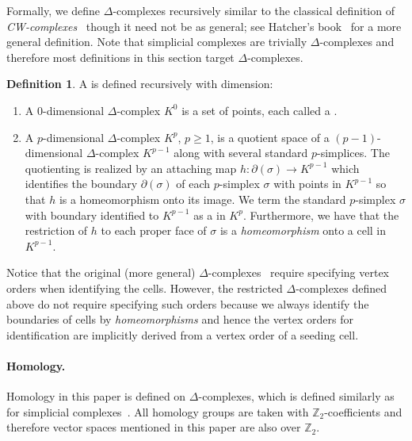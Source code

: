 \documentclass[letterpaper,11pt]{article}
\theoremstyle{mythmstyle}
\theoremstyle{mydefstyle}
\newtheorem{definition}{Definition}
\theoremstyle{plain}
\theoremstyle{definition}
\newtheorem{definition}[theorem]{Definition}
\newcommand{\<}[1]{\langle #1\rangle}
\newcommand{\Zbb}{\mathbb{Z}}
\newcommand{\DG}{\Delta}
\newcommand{\sG}{\sigma}
\begin{document}
Formally, we define $\DG$-complexes recursively
similar to the classical definition of \emph{CW-complexes}~\cite{hatcher2002algebraic} 
though it need not be as general;
see Hatcher's book~\cite{hatcher2002algebraic} for a more general definition. 
Note that simplicial complexes are trivially 
$\DG$-complexes and therefore most definitions
in this section target $\DG$-complexes.

\begin{definition}
 A \defemph{$\DG$-complex} is defined recursively with dimension:
\begin{enumerate}
     \item A $0$-dimensional $\DG$-complex $K^0$ is a set of points, each called a .
     
     
     \item A $p$-dimensional $\DG$-complex $K^p$, $p\geq 1$, 
     is a quotient space of 
     a $(p-1)$-dimensional $\DG$-complex $K^{p-1}$ 
     along with several standard $p$-simplices. The quotienting 
     is realized by an attaching map
     $h:\partial(\sG)\to K^{p-1}$ which identifies the boundary $\partial(\sG)$ of each
     $p$-simplex $\sG$ with points in $K^{p-1}$ 
     so that $h$ is a homeomorphism onto its image.
     We term the standard $p$-simplex $\sG$ with boundary
     identified to $K^{p-1}$ as a  in $K^p$.
     Furthermore, 
     we have that the restriction
     of $h$ to each proper face of $\sG$ is a \emph{homeomorphism} onto a cell in $K^{p-1}$.
 \end{enumerate}
\end{definition}

Notice that the original (more general) $\DG$-complexes~\cite{hatcher2002algebraic} require specifying vertex orders
when identifying the cells.
However, the restricted $\DG$-complexes defined above
do not require specifying such orders because
we always identify the boundaries
of cells by \emph{homeomorphisms} and hence the vertex orders for identification
are implicitly derived from a vertex order of a seeding cell.





\paragraph{Homology.}
Homology in this paper
is defined on $\DG$-complexes,
which is defined similarly as for simplicial complexes~\cite{hatcher2002algebraic}.
All homology groups are taken with $\Zbb_2$-coefficients
and therefore vector spaces mentioned in this paper are also over $\Zbb_2$.
\end{document}

